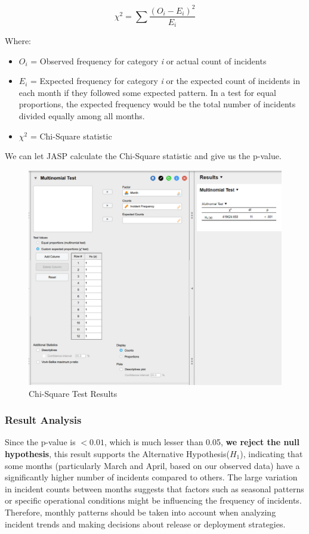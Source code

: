 \documentclass{article}
\begin{document}
\begin{equation}
\chi^2 =  \sum \frac{(O_i - E_i)^2}{E_i}
\end{equation}

Where:
\begin{itemize}
    \item $O_i$ = Observed frequency for category \textit{i} or actual count of incidents
    \item $E_i$ = Expected frequency for category \textit{i} or the expected count of incidents in each month if they followed some expected pattern. In a test for equal proportions, the expected frequency would be the total number of incidents divided equally among all months.
    \item $\chi^2$ = Chi-Square statistic
\end{itemize}

We can let JASP calculate the Chi-Square statistic and give us the p-value.

\begin{figure} [H]
    \centering
    \includegraphics[width=0.5\linewidth]{resources/Screenshot 2024-10-20 170522.png}
    \caption{Chi-Square Test Results}
    \label{fig:enter-label}
\end{figure}

\subsubsection{Result Analysis}

Since the p-value is $< 0.01$, which is much lesser than 0.05, \textbf{we reject the null hypothesis}, this result supports the Alternative Hypothesis($H_1$), indicating that some months (particularly March and April, based on our observed data) have a significantly higher number of incidents compared to others. The large variation in incident counts between months suggests that factors such as seasonal patterns or specific operational conditions might be influencing the frequency of incidents. Therefore, monthly patterns should be taken into account when analyzing incident trends and making decisions about release or deployment strategies.
\end{document}
